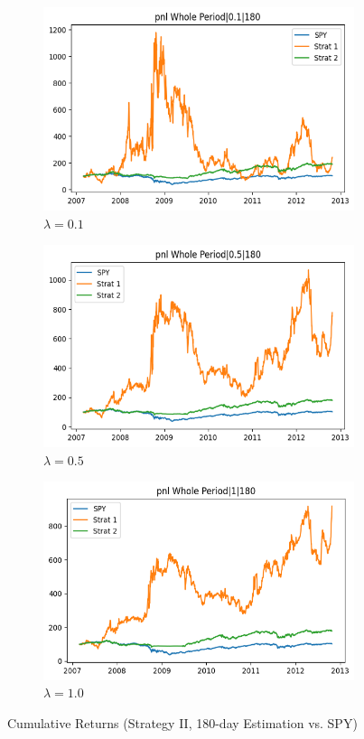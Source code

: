 \documentclass[12pt]{article}
\begin{document}
\begin{figure}[H]
\centering
\begin{subfigure}{0.32\textwidth}
\includegraphics[width=\linewidth]{"plots/pnl_wholeperiod_0.1_180.png"}
\caption{$\lambda=0.1$}
\end{subfigure}
\begin{subfigure}{0.32\textwidth}
\includegraphics[width=\linewidth]{"plots/pnl_wholeperiod_0.5_180.png"}
\caption{$\lambda=0.5$}
\end{subfigure}
\begin{subfigure}{0.32\textwidth}
\includegraphics[width=\linewidth]{"plots/pnl_wholeperiod_1_180.png"}
\caption{$\lambda=1.0$}
\end{subfigure}
\caption{Cumulative Returns (Strategy II, 180-day Estimation vs. SPY)}
\label{fig:pnl_180}
\end{figure}
\end{document}
